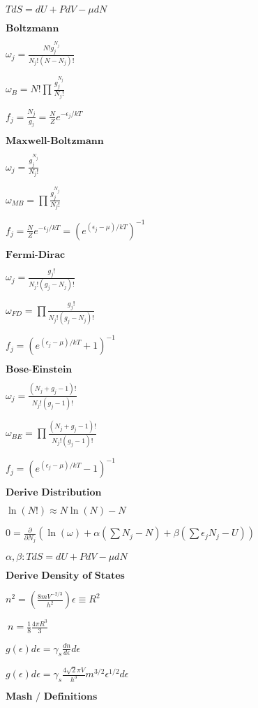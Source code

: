 \documentclass{article}
\author{John Meade}
\begin{document}
\begin{multicols}{3}
\noindent
\fontsize{8}{10}\selectfont

$TdS=dU+PdV-\mu dN$

$\textbf{Boltzmann}$

$\omega_j = \frac{N! g_j^{N_j}}{N_j! (N - N_j)!}$

$\omega_B = N! \prod \frac{g_j^{N_j}}{N_j!}$

$f_j = \frac{N_j}{g_j}=\frac{N}{Z}e^{- \epsilon_j / kT}$

$\textbf{Maxwell-Boltzmann}$

$\omega_j = \frac{g_j^{N_j}}{N_j!}$

$\omega_{MB} = \prod \frac{g_j^{N_j}}{N_j!}$

$f_j=\frac{N}{Z}e^{- \epsilon_j / kT}=(e^{(\epsilon_j-\mu)/kT})^{-1}$

$\textbf{Fermi-Dirac}$

$\omega_j = \frac{g_j!}{N_j! (g_j - N_j)!}$

$\omega_{FD} = \prod \frac{g_j!}{N_j!(g_j - N_j)!}$

$f_j = (e^{(\epsilon_j - \mu)/kT}+1)^{-1}$

$\textbf{Bose-Einstein}$

$\omega_j = \frac{(N_j+g_j-1)!}{N_j!(g_j-1)!}$

$\omega_{BE}=\prod \frac{(N_j+g_j-1)!}{N_j!(g_j-1)!}$

$f_j=(e^{(\epsilon_j - \mu)/kT}-1)^{-1}$

$\textbf{Derive Distribution}$

$\ln(N!) \approx N\ln(N)-N$

$0 = \frac{\partial}{\partial N_j}(\ln(\omega) + \alpha ( \sum N_j - N) + \beta (\sum \epsilon_j N_j - U))$

$\alpha, \beta : TdS=dU+PdV-\mu dN$

$\textbf{Derive Density of States}$

$n^2=\left (\frac{8mV^{-2/3}}{h^2} \right )\epsilon \equiv R^2$

$\:n=\frac{1}{8}\frac{4\pi R^3}{3}$

$g(\epsilon)d\epsilon = \gamma_s \frac{dn}{d\epsilon}d\epsilon$

$g(\epsilon)d\epsilon = \gamma_s \frac{4 \sqrt{2} \pi V}{h^3} m^{3/2}\epsilon^{1/2} d\epsilon$

$\textbf{Mash / Definitions}$


\end{multicols}
\end{document}
